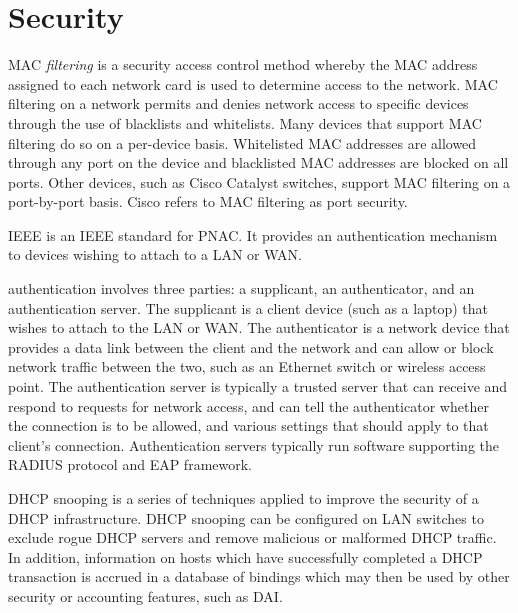 \section{Security}

\ac{MAC} \emph{filtering} is a security access control method whereby the \acs{MAC} address assigned to each network card is used to determine access to the network.
\ac{MAC} filtering on a network permits and denies network access to specific devices through the use of blacklists and whitelists.
Many devices that support \acs{MAC} filtering do so on a per-device basis.
Whitelisted \ac{MAC} addresses are allowed through any port on the device and blacklisted \acs{MAC} addresses are blocked on all ports.
Other devices, such as Cisco Catalyst switches, support \acs{MAC} filtering on a port-by-port basis.
Cisco refers to \acs{MAC} filtering as port security.

\acs{IEEE}  is an \acs{IEEE} standard for \ac{PNAC}.
It provides an authentication mechanism to devices wishing to attach to a \ac{LAN} or \ac{WAN}.

 authentication involves three parties: a supplicant, an authenticator, and an authentication server.
The supplicant is a client device (such as a laptop) that wishes to attach to the \ac{LAN} or \ac{WAN}.
The authenticator is a network device that provides a data link between the client and the network and can allow or block network traffic between the two, such as an Ethernet switch or wireless access point.
The authentication server is typically a trusted server that can receive and respond to requests for network access, and can tell the authenticator whether the connection is to be allowed, and various settings that should apply to that client's connection.
Authentication servers typically run software supporting the \ac{RADIUS} protocol and \ac{EAP} framework.

\ac{DHCP} snooping is a series of techniques applied to improve the security of a \ac{DHCP} infrastructure.
\ac{DHCP} snooping can be configured on \ac{LAN} switches to exclude rogue \ac{DHCP} servers and remove malicious or malformed \ac{DHCP} traffic.
In addition, information on hosts which have successfully completed a \ac{DHCP} transaction is accrued in a database of bindings which may then be used by other security or accounting features, such as \acl{DAI}.

